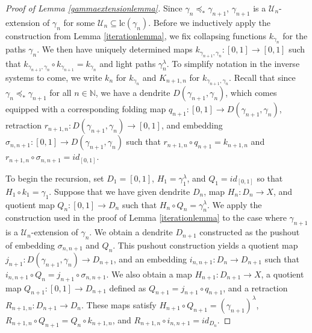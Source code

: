 \documentclass[12pt, leqno]{amsart}
\newcommand{\light}{\lambda}
\newcommand{\ord}{\preceq_{\ast}}
\newcommand{\ui}{[0,1]}
\newcommand{\scru}{\mathscr{U}}
\newcommand{\bbn}{\mathbb{N}}
\newcommand{\lc}{\text{lc}}
\theoremstyle{definition}\newtheorem{definition}[theorem]{Definition}
\begin{document}
\begin{proof}[Proof of Lemma \ref{gammaextensionlemma}]
Since $\gamma_n\ord\gamma_{n+1}$, $\gamma_{n+1}$ is a $\scru_n$-extension of $\gamma_{n}$ for some $\scru_n\subseteq \lc(\gamma_n)$. Before we inductively apply the construction from Lemma \ref{iterationlemma}, we fix collapsing functions $k_{\gamma_n}$ for the paths $\gamma_n$. We then have uniquely determined maps $k_{\gamma_{n+1},\gamma_n}:\ui\to\ui$ such that $k_{\gamma_{n+1},\gamma_n}\circ k_{\gamma_{n+1}}=k_{\gamma_n}$ and light  paths $\gamma_{n}^{\lambda}$. To simplify notation in the inverse systems to come, we write $k_n$ for $k_{\gamma_n}$ and $K_{n+1,n}$ for $k_{\gamma_{n+1},\gamma_n}$. Recall that since $\gamma_{n}\ord\gamma_{n+1}$ for all $n\in\bbn$, we have a dendrite $D(\gamma_{n+1},\gamma_{n})$, which comes equipped with a corresponding folding map $q_{n+1}:\ui\to D(\gamma_{n+1},\gamma_{n})$, retraction $r_{n+1,n}:D(\gamma_{n+1},\gamma_{n})\to\ui$, and embedding $\sigma_{n,n+1}:\ui\to D(\gamma_{n+1},\gamma_{n})$ such that $r_{n+1,n}\circ q_{n+1}=k_{n+1,n}$ and $r_{n+1,n}\circ \sigma_{n,n+1}=id_{\ui}$.

To begin the recursion, set $D_1=\ui$, $H_1=\gamma_{1}^{\light}$, and $Q_1=id_{\ui}$ so that $H_1\circ k_{1}=\gamma_1$. Suppose that we have given dendrite $D_n$, map $H_n:D_n\to X$, and quotient map $Q_n:\ui\to D_n$ such that $H_n\circ Q_n=\gamma_{n}^{\light}$. We apply the construction used in the proof of Lemma \ref{iterationlemma} to the case where $\gamma_{n+1}$ is a $\scru_n$-extension of $\gamma_n$. We obtain a dendrite $D_{n+1}$ constructed as the pushout of embedding $\sigma_{n,n+1}$ and $Q_{n}$. This pushout construction yields a quotient map $j_{n+1}:D(\gamma_{n+1},\gamma_n)\to D_{n+1}$, and an embedding $i_{n,n+1}:D_n\to D_{n+1}$  such that  $i_{n,n+1}\circ Q_n=j_{n+1}\circ \sigma_{n,n+1}$. We also obtain a map $H_{n+1}:D_{n+1}\to X$, a quotient map $Q_{n+1}:\ui\to D_{n+1}$ defined as $Q_{n+1}=j_{n+1}\circ q_{n+1}$, and a retraction $R_{n+1,n}:D_{n+1}\to D_n$. These maps satisfy $H_{n+1}\circ Q_{n+1}=(\gamma_{n+1})^{\light}$, $R_{n+1,n}\circ Q_{n+1}=Q_{n}\circ k_{n+1,n}$, and $R_{n+1,n}\circ i_{n,n+1}=id_{D_n}$.


\end{proof}
\end{document}

